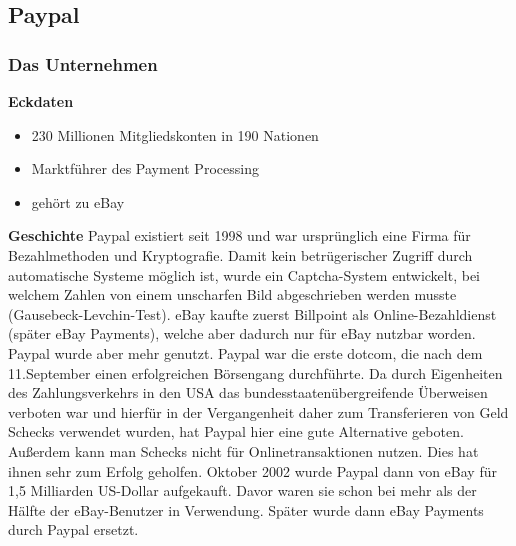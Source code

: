 \subsection{Paypal}
\subsubsection{Das Unternehmen}

\textbf{Eckdaten}
\begin{itemize}
\item 230 Millionen Mitgliedskonten in 190 Nationen
\item Marktführer des Payment Processing
\item gehört zu eBay
\end{itemize}
%
%
\textbf{Geschichte}
Paypal existiert seit 1998 und war ursprünglich eine Firma für Bezahlmethoden und Kryptografie. Damit kein betrügerischer Zugriff durch automatische Systeme möglich ist, wurde ein Captcha-System entwickelt, bei welchem Zahlen von einem unscharfen Bild abgeschrieben werden musste (Gausebeck-Levchin-Test). eBay kaufte zuerst Billpoint als Online-Bezahldienst (später eBay Payments), welche aber dadurch nur für eBay nutzbar worden. Paypal wurde aber mehr genutzt. Paypal war die erste dotcom, die nach dem 11.September einen erfolgreichen Börsengang durchführte. Da durch Eigenheiten des Zahlungsverkehrs in den USA das bundesstaatenübergreifende Überweisen verboten war und hierfür in der Vergangenheit daher zum Transferieren von Geld Schecks verwendet wurden, hat Paypal hier eine gute Alternative geboten. Außerdem kann man Schecks nicht für Onlinetransaktionen nutzen. Dies hat ihnen sehr zum Erfolg geholfen. Oktober 2002 wurde Paypal dann von eBay für 1,5 Milliarden US-Dollar aufgekauft. Davor waren sie schon bei mehr als der Hälfte der eBay-Benutzer in Verwendung. Später wurde dann eBay Payments durch Paypal ersetzt.
